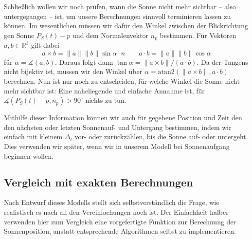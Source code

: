 \documentclass[
    paper=a4,
    DIV14,
    fontsize=12pt,
    pagesize=pdftex,
    toc=bibliographynumbered
]{scrartcl}
\numberwithin{figure}{section}
\numberwithin{equation}{section}
\numberwithin{table}{section}
\newcommand*\setR{\mathds{R}}
\begin{document}
Schließlich wollen wir noch prüfen, wann die Sonne nicht mehr sichtbar -- also
untergegangen -- ist, um unsere Berechnungen sinnvoll terminieren lassen zu können.
Im wesentlichen müssen wir dafür den Winkel zwischen der Blickrichtung gen Sonne
$P_S(t) - p$ und dem Normalenvektor $n_p$ bestimmen. Für Vektoren $a, b\in \setR^3$ gilt
dabei
\begin{equation*}
    a\times b = \|a\|\|b\| \sin \alpha \cdot n \qquad
    a \cdot b = \|a\|\|b\| \cos \alpha
\end{equation*}
für $\alpha = \measuredangle(a, b)$. Daraus folgt dann $\tan\alpha = \|a\times b\|/(a\cdot
b)$. Da der Tangens nicht bijektiv ist, müssen wir den Winkel über $\alpha =
\mathrm{atan2}(\|a\times b\|, a\cdot b)$ berechnen. Nun ist nur noch zu entscheiden, für
welche Winkel die Sonne nicht mehr sichtbar ist: Eine naheliegende und einfache Annahme
ist, für $\measuredangle(P_S(t) - p, n_p) > 90^\circ$ nichts zu tun.

Mithilfe dieser Information können wir auch für gegebene Position und Zeit den den
nächsten oder letzten Sonnenauf- und Untergang bestimmen, indem wir einfach mit kleinem
$\Delta_t$ vor- oder zurückzählen, bis die Sonne auf- oder untergeht. Dies verwenden wir
später, wenn wir in unserem Modell bei Sonnenaufgang beginnen wollen.

\subsection{Vergleich mit exakten Berechnungen}
Nach Entwurf dieses Modells stellt sich selbstverständlich die Frage, wie realistisch es
nach all den Vereinfachungen noch ist. Der Einfachheit halber verwenden hier zum Vergleich
eine vorgefertigte Funktion zur Berechnung der Sonnenposition, anstatt entsprechende
Algorithmen selbst zu implementieren.
\end{document}
